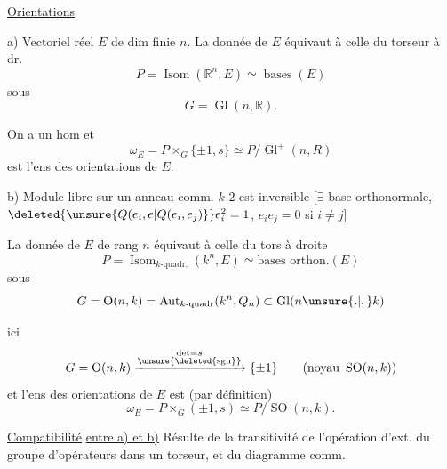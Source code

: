 \uline{Orientations}

a) Vectoriel réel $E$ de dim finie $n$. La donnée de $E$ équivaut à celle du torseur à dr.
\[
 P=\operatorname{Isom}(\mathbb R^n,E)\simeq\operatorname{bases}(E)
\]
sous
\[
 G=\operatorname{Gl}(n,\mathbb R).
\]

On a un hom
et
\[
 \omega_E=P\times_G\{\pm1,s\}\simeq P/\operatorname{Gl}^+(n,R)
\]
est l'ens des orientations de $E$.

b) Module  libre   sur un anneau comm. $k$  $2$ est inversible [$\exists$ base orthonormale, $\deleted{\unsure{Q(e_i,e|Q(e_i,e_j)}} e_i^2=1$, $e_i e_j=0$ si $i\ne j$]

La donnée de $E$ de rang $n$ équivaut à celle du tors à droite
\[
 P=\operatorname{Isom}_{k\text{-quadr.}}(k^n,E)\simeq\text{bases orthon.}(E)
\]
sous
\[
 G=\operatorname{O}(n,k)=\operatorname{Aut}_{k\text{-quadr}}(k^n,Q_n)\subset\operatorname{Gl}(n\unsure{.|,}k)
\]

 ici
\[
 G=\operatorname{O}(n,k)\xrightarrow{\substack{\det=s\\\unsure{\deleted{\operatorname{sgn}}}}}\{\pm1\}\qquad(\text{noyau }\operatorname{SO}(n,k))
\]
et l'ens des orientations de $E$ est (par définition)
\[
 \omega_E=P\times_G(\pm1,s)\simeq P/\operatorname{SO}(n,k).
\]

\uline{Compatibilité} \uline{entre a) et b)} Résulte de la transitivité de l'opération d'ext. du groupe d'opérateurs dans un torseur, et du diagramme comm.
